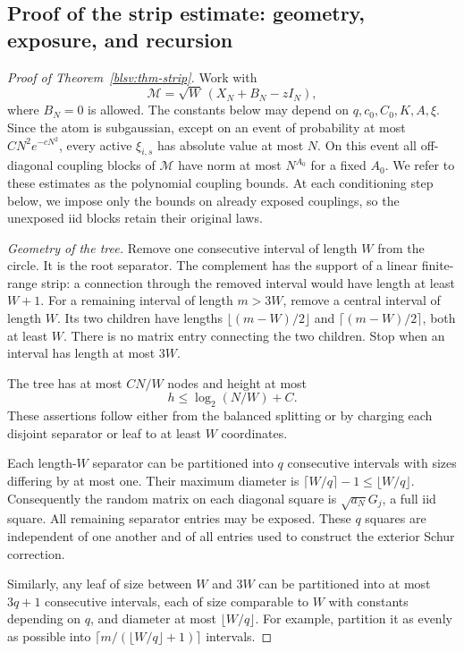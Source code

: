 \documentclass[11pt,reqno]{amsart}
\numberwithin{equation}{section}
\theoremstyle{plain}
\theoremstyle{definition}
\theoremstyle{remark}
\providecommand{\blsvId}{I}
\begin{document}
\subsection{Proof of the strip estimate: geometry, exposure, and recursion}
\begin{proof}[Proof of Theorem~\ref{blsv:thm-strip}]
Work with
\[
 \mathcal M=\sqrt W\,(X_N+B_N-z\blsvId_N),
\]
where $B_N=0$ is allowed. The constants below may depend on
$q,c_0,C_0,K,A,\xi$. Since the atom is subgaussian, except on an event
of probability at most $CN^2e^{-cN^2}$, every active $\xi_{i,s}$ has
absolute value at most $N$. On this event all off-diagonal coupling
blocks of $\mathcal M$ have norm at most $N^{A_0}$ for a fixed $A_0$.
We refer to these estimates as the polynomial coupling bounds. At each
conditioning step below, we impose only the bounds on already exposed
couplings, so the unexposed iid blocks retain their original laws.

\smallskip\noindent\emph{Geometry of the tree.}
Remove one consecutive interval of length $W$ from the circle. It is
the root separator. The complement has the support of a linear
finite-range strip: a connection through the removed interval would
have length at least $W+1$. For a remaining interval of length $m>3W$,
remove a central interval of length $W$. Its two children have lengths
$\lfloor(m-W)/2\rfloor$ and $\lceil(m-W)/2\rceil$, both at least $W$.
There is no matrix entry connecting the two children. Stop when an
interval has length at most $3W$.

The tree has at most $CN/W$ nodes and height at most
\begin{equation}\label{blsv:eq-height}
 h\le\log_2(N/W)+C.
\end{equation}
These assertions follow either from the balanced splitting or by
charging each disjoint separator or leaf to at least $W$ coordinates.

Each length-$W$ separator can be partitioned into $q$ consecutive
intervals with sizes differing by at most one. Their maximum diameter
is $\lceil W/q\rceil-1\le\lfloor W/q\rfloor$.
Consequently the random matrix on each diagonal square is
$\sqrt{a_N}G_j$, a full iid square. All remaining separator entries may
be exposed. These $q$ squares are independent of one another and of all
entries used to construct the exterior Schur correction.

Similarly, any leaf of size between $W$ and $3W$ can be partitioned into
at most $3q+1$ consecutive intervals, each of size comparable to $W$
with constants depending on $q$, and diameter at most
$\lfloor W/q\rfloor$. For example, partition it as evenly as possible
into $\lceil m/(\lfloor W/q\rfloor+1)\rceil$ intervals.


\end{proof}
\end{document}
